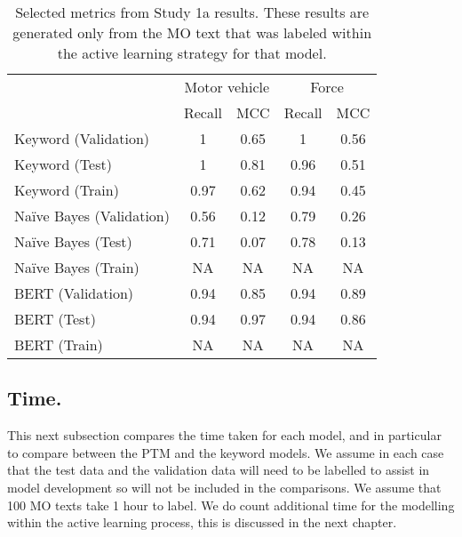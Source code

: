 \begin{table}[]
\begin{tabular}{@{}lcccc@{}}
\toprule
                         & \multicolumn{2}{c}{Motor vehicle} & \multicolumn{2}{c}{Force} \\ 
                         & Recall           & MCC            & Recall       & MCC        \\\midrule
Keyword (Validation)     & 1                & 0.65           & 1            & 0.56       \\
Keyword (Test)           & 1                & 0.81           & 0.96         & 0.51       \\
Keyword (Train)          & 0.97             & 0.62           & 0.94         & 0.45       \\\midrule
Naïve Bayes (Validation) & 0.56             & 0.12           & 0.79            & 0.26          \\
Naïve Bayes (Test)       & 0.71             & 0.07           & 0.78           & 0.13         \\
Naïve Bayes (Train)      & NA               & NA             & NA           & NA         \\\midrule
BERT (Validation)        & 0.94                & 0.85           & 0.94            & 0.89          \\
BERT (Test)              & 0.94                & 0.97           &0.94           & 0.86         \\
BERT (Train)             & NA               & NA             & NA           & NA         \\ \bottomrule
\end{tabular}
\caption[Model metrics. PF1 data. Force used and motor vehicle model.]{\label{tab:results_study_1} Selected metrics from Study 1a results. These results are generated only from the MO text that was labeled within the active learning strategy for that model.}
\end{table}


\subsection{Time.} This next subsection compares the time taken for each model, and in particular to compare between the PTM and the keyword models. We assume in each case that the test data and the validation data will need to be labelled to assist in model development so will not be included in the comparisons. We assume that 100 MO texts take 1 hour to label. We do count additional time for the modelling within the active learning process, this is discussed in the next chapter. 


